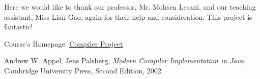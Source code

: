 \documentclass[letterpaper, 14pt]{article}
\begin{document}
Here we would like to thank our professor, Mr. Mohsen Lesani, and our teaching assistant, Miss Lian Gao, again for their help and consideration. This project is fantastic! 

\begin{thebibliography}{9}

	Course's Homepage: 
	\href{https://www.cs.ucr.edu/~lesani/teaching/cp/cp.html}{Compiler Project}. 

	Andrew W. Appel, Jens Palsberg, 
	\textit{Modern Compiler Implementation in Java},
	Cambridge University Press, 
	Second Edition, 
	2002. 

\end{thebibliography}
\end{document}
